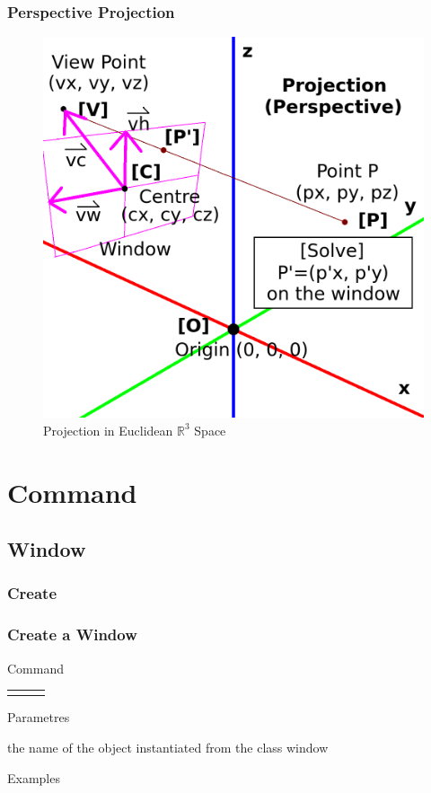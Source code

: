 \documentclass[10pt]{beamer}
\begin{document}
\begin{frame} \frametitle{Perspective Projection}

	\begin{figure}[t]
		\includegraphics[width=.5\columnwidth]{fig/perspective-projection.png}
		\caption{Projection in Euclidean $\mathbb{R}^3$ Space}
	\end{figure}

\end{frame}


\section{Command}

\subsection{Window}

\subsubsection{Create}

\begin{frame}[t] \frametitle{Create a Window}

	\begin{block}{Command} 
		\begin{tabularx}{\textwidth}{@{}l@{}l@{}R}
			 &
				 & \InstrItem
		\end{tabularx}
	\end{block}

	\begin{block}{Parametres} \begin{itemize}
		 the name of the object instantiated from the class window
	\end{itemize} \end{block}

	\begin{block}{Examples}
	\end{block}

\end{frame}
\end{document}
